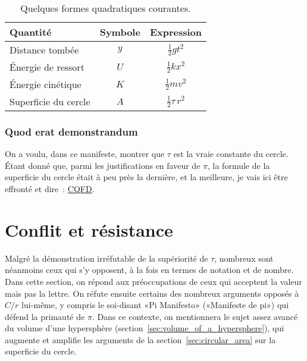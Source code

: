 \begin{table}
\begin{center}
\begin{tabular}{lcc}
Quantité & Symbole & Expression \\ \hline
Distance tombée & $y$ & $\textstyle{\frac{1}{2}}gt^2$ \smallskip \\
Énergie de ressort & $U$ & $\textstyle{\frac{1}{2}}kx^2$ \smallskip \\
Énergie cinétique & $K$ & $\textstyle{\frac{1}{2}}mv^2$ \smallskip \\
Superficie du cercle & $A$ & $\textstyle{\frac{1}{2}}\tau\,r^2$
\end{tabular}
\end{center}
\caption{Quelques formes quadratiques courantes.\label{table:quadratic_forms}}
\end{table}

    \subsubsection{Quod erat demonstrandum} %
    \label{sec:quod_erat_demonstrandum}

On a voulu, dans ce manifeste, montrer que $\tau$ est la vraie constante du
cercle. Étant donné que, parmi les justifications en faveur de $\pi$, la formule de la superficie du cercle était à peu près
la dernière, et la meilleure, je vais ici être
effronté et dire~:
\href{https://fr.wikipedia.org/wiki/CQFD_(math%C3%A9matiques)}{CQFD}.



\section{Conflit et résistance} %
\label{sec:conflict_and_resistance}

Malgré la démonstration irréfutable de la supériorité de $\tau$, nombreux sont
néanmoins ceux qui s'y opposent, à la fois en termes de notation et de nombre. Dans cette
section, on répond aux préoccupations de ceux qui acceptent la valeur mais pas
la lettre. On réfute ensuite certains des nombreux arguments opposés à $C/r$
lui-même, y compris le soi-disant «\ns Pi Manifesto\ns » («\ns Manifeste de pi\ns ») qui
défend la primauté de $\pi$. Dans ce contexte, on mentionnera le sujet assez
avancé du volume d'une hypersphère
(section~\ref{sec:volume_of_a_hypersphere}), qui augmente et amplifie les
arguments de la section~\ref{sec:circular_area} sur la superficie du cercle.

